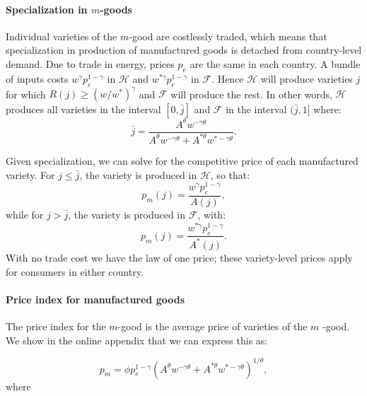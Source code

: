 \documentclass[notitlepage,12pt]{article}
\begin{document}
\paragraph{Specialization in $m$-goods}

Individual varieties of the $m$-good are costlessly traded, which means that
specialization in production of manufactured goods is detached from
country-level demand. Due to trade in energy, prices $p_{e}$ are the same in
each country. A bundle of inputs costs $w^{\gamma }p_{e}^{1-\gamma }$ in $%
\mathcal{H}$ and $w^{\ast \gamma }p_{e}^{1-\gamma }$ in $\mathcal{F}$. Hence 
$\mathcal{H}$ will produce varieties $j$ for which $R(j)\geq \left(
w/w^{\ast }\right) ^{\gamma }$ and $\mathcal{F}$ will produce the rest. In
other words, $\mathcal{H}$ produces all varieties in the interval $[0,\bar{j}%
]$ and $\mathcal{F}$ in the interval $(\bar{j},1]$ where:%
\begin{equation}
\bar{j}=\frac{A^{\theta }w^{-\gamma \theta }}{A^{\theta }w^{-\gamma \theta
}+A^{\ast \theta }w^{\ast -\gamma \theta }}.  \label{jbar}
\end{equation}

Given specialization, we can solve for the competitive price of each
manufactured variety. For $j\leq \bar{j}$, the variety is produced in $%
\mathcal{H}$, so that:%
\begin{equation}
p_{m}(j)=\frac{w^{\gamma }p_{e}^{1-\gamma }}{A(j)},  \label{pm(j)}
\end{equation}%
while for $j>\bar{j}$, the variety is produced in $\mathcal{F}$, with:%
\begin{equation*}
p_{m}(j)=\frac{w^{\ast \gamma }p_{e}^{1-\gamma }}{A^{\ast }(j)}.
\end{equation*}%
With no trade cost we have the law of one price; these variety-level prices
apply for consumers in either country.

\paragraph{Price index for manufactured goods}

The price index for the $m$-good is the average price of varieties of the $m$%
-good. We show in the online appendix that we can express this as:

\begin{equation*}
p_{m}=\phi p_{e}^{1-\gamma }\left( A^{\theta }w^{-\gamma \theta }+A^{\ast
\theta }w^{\ast -\gamma \theta }\right) ^{1/\theta },
\end{equation*}%
where
\end{document}
